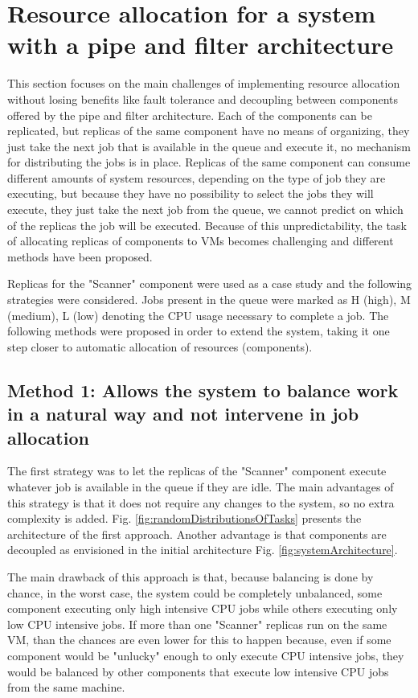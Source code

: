 \section{Resource allocation for a system with a pipe and filter architecture}
\label{sec:resourceAllocation}
This section focuses on the main challenges of implementing resource allocation without losing benefits like fault tolerance and decoupling between components offered by the pipe and filter architecture. Each of the components can be replicated, but replicas of the same component have no means of organizing, they just take the next job that is available in the queue and execute it, no mechanism for distributing the jobs is in place. Replicas of the same component can consume different amounts of system resources, depending on the type of job they are executing, but because they have no possibility to select the jobs they will execute, they just take the next job from the queue, we cannot predict on which of the replicas the job will be executed. Because of this unpredictability, the task of allocating replicas of components to VMs becomes challenging and different methods have been proposed.

Replicas for the "Scanner" component were used as a case study and the following strategies were considered. Jobs present in the queue were marked as H (high), M (medium), L (low) denoting the CPU usage necessary to complete a job. The following methods were proposed in order to extend the system, taking it one step closer to automatic allocation of resources (components).

\subsection{Method 1: Allows the system to balance work in a natural way and not intervene in job allocation}
\label{subsection:method1}
The first strategy was to let the replicas of the "Scanner" component execute whatever job is available in the queue if they are idle. The main advantages of this strategy is that it does not require any changes to the system, so no extra complexity is added. Fig. \ref{fig:randomDistributionsOfTasks} presents the architecture of the first approach. Another advantage is that components are decoupled as envisioned in the initial architecture Fig. \ref{fig:systemArchitecture}.

The main drawback of this approach is that, because balancing is done by chance, in the worst case, the system could be completely unbalanced, some component executing only high intensive CPU jobs while others executing only low CPU intensive jobs. If more than one "Scanner" replicas run on the same VM, than the chances are even lower for this to happen because, even if some component would be "unlucky" enough to only execute CPU intensive jobs, they would be balanced by other components that execute low intensive CPU jobs from the same machine.

